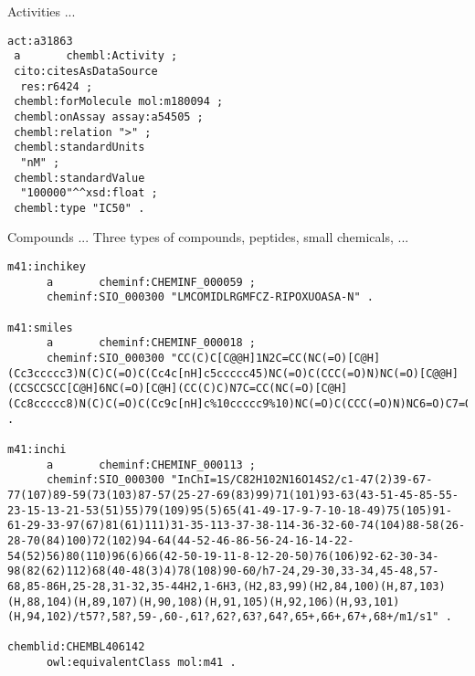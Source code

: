 \documentclass[sw]{iosart2c}
\begin{document}
Activities ...

\begin{small}
\begin{verbatim}
act:a31863
 a       chembl:Activity ;
 cito:citesAsDataSource
  res:r6424 ;
 chembl:forMolecule mol:m180094 ;
 chembl:onAssay assay:a54505 ;
 chembl:relation ">" ;
 chembl:standardUnits
  "nM" ;
 chembl:standardValue
  "100000"^^xsd:float ;
 chembl:type "IC50" .
\end{verbatim}
\end{small}

Compounds ... Three types of compounds, peptides, small chemicals, ...

\begin{tiny}
\begin{verbatim}
m41:inchikey
      a       cheminf:CHEMINF_000059 ;
      cheminf:SIO_000300 "LMCOMIDLRGMFCZ-RIPOXUOASA-N" .

m41:smiles
      a       cheminf:CHEMINF_000018 ;
      cheminf:SIO_000300 "CC(C)C[C@@H]1N2C=CC(NC(=O)[C@H](Cc3ccccc3)N(C)C(=O)C(Cc4c[nH]c5ccccc45)NC(=O)C(CCC(=O)N)NC(=O)[C@@H](CCSCCSCC[C@H]6NC(=O)[C@H](CC(C)C)N7C=CC(NC(=O)[C@H](Cc8ccccc8)N(C)C(=O)C(Cc9c[nH]c%10ccccc9%10)NC(=O)C(CCC(=O)N)NC6=O)C7=O)NC1=O)C2=O" .

m41:inchi
      a       cheminf:CHEMINF_000113 ;
      cheminf:SIO_000300 "InChI=1S/C82H102N16O14S2/c1-47(2)39-67-77(107)89-59(73(103)87-57(25-27-69(83)99)71(101)93-63(43-51-45-85-55-23-15-13-21-53(51)55)79(109)95(5)65(41-49-17-9-7-10-18-49)75(105)91-61-29-33-97(67)81(61)111)31-35-113-37-38-114-36-32-60-74(104)88-58(26-28-70(84)100)72(102)94-64(44-52-46-86-56-24-16-14-22-54(52)56)80(110)96(6)66(42-50-19-11-8-12-20-50)76(106)92-62-30-34-98(82(62)112)68(40-48(3)4)78(108)90-60/h7-24,29-30,33-34,45-48,57-68,85-86H,25-28,31-32,35-44H2,1-6H3,(H2,83,99)(H2,84,100)(H,87,103)(H,88,104)(H,89,107)(H,90,108)(H,91,105)(H,92,106)(H,93,101)(H,94,102)/t57?,58?,59-,60-,61?,62?,63?,64?,65+,66+,67+,68+/m1/s1" .

chemblid:CHEMBL406142
      owl:equivalentClass mol:m41 .


\end{verbatim}
\end{tiny}
\end{document}
